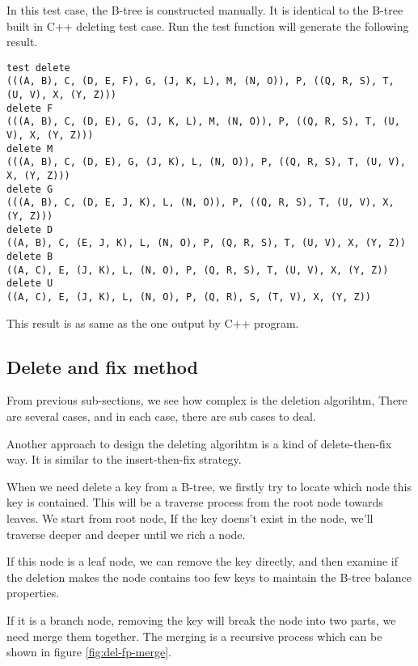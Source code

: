 \documentclass{article}
\begin{document}
In this test case, the B-tree is constructed manually. It is identical to
the B-tree built in C++ deleting test case. Run the test function will
generate the following result.

\begin{verbatim}
test delete
(((A, B), C, (D, E, F), G, (J, K, L), M, (N, O)), P, ((Q, R, S), T, (U, V), X, (Y, Z)))
delete F
(((A, B), C, (D, E), G, (J, K, L), M, (N, O)), P, ((Q, R, S), T, (U, V), X, (Y, Z)))
delete M
(((A, B), C, (D, E), G, (J, K), L, (N, O)), P, ((Q, R, S), T, (U, V), X, (Y, Z)))
delete G
(((A, B), C, (D, E, J, K), L, (N, O)), P, ((Q, R, S), T, (U, V), X, (Y, Z)))
delete D
((A, B), C, (E, J, K), L, (N, O), P, (Q, R, S), T, (U, V), X, (Y, Z))
delete B
((A, C), E, (J, K), L, (N, O), P, (Q, R, S), T, (U, V), X, (Y, Z))
delete U
((A, C), E, (J, K), L, (N, O), P, (Q, R), S, (T, V), X, (Y, Z))
\end{verbatim}

This result is as same as the one output by C++ program.


\subsection{Delete and fix method}

From previous sub-sections, we see how complex is the deletion algorihtm,
There are several cases, and in each case, there are sub cases to deal.

Another approach to design the deleting algorihtm is a kind of delete-then-fix
way. It is similar to the insert-then-fix strategy.

When we need delete a key from a B-tree, we firstly try to locate
which node this key is contained. This will be a traverse process
from the root node towards leaves. We start from root node, If the 
key doens't exist in the node, we'll traverse deeper and deeper
until we rich a node.

If this node is a leaf node, we can remove the key directly, and then
examine if the deletion makes the node contains too few keys to 
maintain the B-tree balance properties.

If it is a branch node, removing the key will break the node into
two parts, we need merge them together. The merging is a recursive
process which can be shown in figure \ref{fig:del-fp-merge}.
\end{document}
